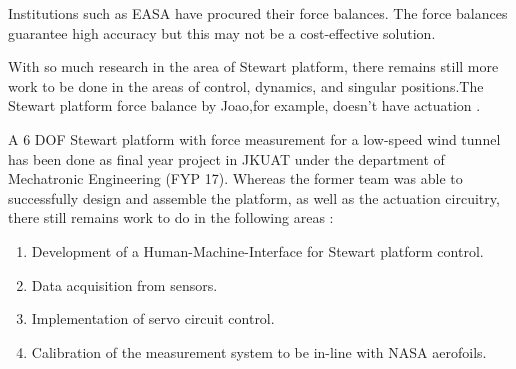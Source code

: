Institutions such as EASA have procured their force balances. The force balances guarantee high accuracy but this may not be a cost-effective solution.

With so much research in the area of Stewart platform, there remains still more work to be done in the areas of control, dynamics, and singular positions.The Stewart platform force balance by Joao,for example, doesn't have actuation \cite{ferreira2015design}.

A 6 DOF Stewart platform with force measurement for a low-speed wind tunnel has been done as final year project in JKUAT under the department of Mechatronic Engineering (FYP 17). Whereas the former team was able to successfully design and assemble the platform, as well as the actuation circuitry, there still remains work to do in the following areas \cite{caleb}:
\begin{enumerate}
	\item Development of a Human-Machine-Interface for Stewart platform control.
	\item Data acquisition from sensors.
	\item Implementation of servo circuit control.
	\item Calibration of the measurement system to be in-line with NASA aerofoils.
\end{enumerate}